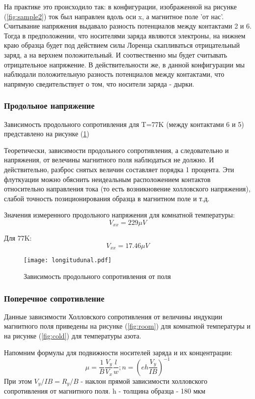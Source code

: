 На практике это происходило так: в конфигурации, изображенной на рисунке (\ref{fig:sample2}) ток был направлен вдоль оси x, а магнитное поле 'от нас'. Считывание напряжения выдавало разность потенциалов между контактами 2 и 6. Тогда в предположении, что носителями заряда являются электроны, на нижнем краю образца будет под действием силы Лоренца скапливаться отрицательный заряд, а на верхнем положительный. И соотвественно мы будет считывать отрицательное напряжение. В действительности же, в данной конфигурации мы наблюдали положительную разность потенциалов между контактами, что напрямую сведительствует о том, что носители заряда - дырки.
\subsubsection{Продольное напряжение}

Зависимость продольного сопротивления для T=77K (между контактами 6 и 5) представлено на рисунке (\ref{fig:long})

Теоретически, зависимости продольного сопротивления, а следовательно и напряжения, от велечины магнитного поля наблюдаться не должно. И действительно, разброс снятых величин составляет порядка 1 процента. Эти флуткуации можно обяснить неидеальным расположением контактов относительно направления тока (то есть возникновение холловского напряжения), слабой точность позиционирования образца в магнитном поле и т.д. 

Значения измеренного продольного напряжения для комнатной температуры:
$$V_{xx} = 229 \mu V  $$

Для 77K:
$$V_{xx} = 17.46 \mu V $$

\begin{figure}[H]
	\centering
	\texttt{[image: longitudunal.pdf]}
	\caption{Зависимость продольного сопротивления от поля}
	\label{fig:long}
\end{figure}

\subsubsection{Поперечное сопротивление}

Данные зависимости Холловского сопротивления от величины индукции магнитного поля приведены на рисунке (\ref{fig:room}) для комнатной температуры и на рисунке (\ref{fig:cold}) для температуры азота.

Напомним формулы для подвижности носителей заряда и их концентрации:
$$\mu=\frac{1}{B}\frac{V_y}{V_x}\frac{l}{w};   n=(eh\frac{V_y}{IB})^{-1}  $$
При этом $V_y/IB = R_y/B$ - наклон прямой зависимости холловского сопротивления от магнитного поля. h - толщина образца - 180 мкм

